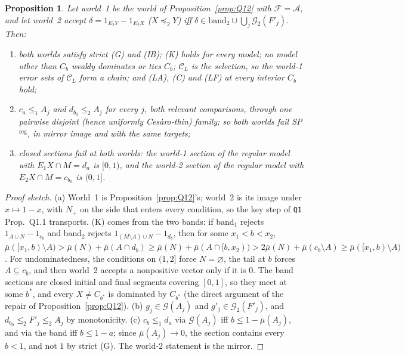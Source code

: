 \documentclass[11pt]{article}
\newtheorem{proposition}[theorem]{Proposition}
\theoremstyle{definition}
\theoremstyle{remark}
\newcommand{\C}{\mathcal C}
\newcommand{\src}[1]{\texttt{#1}}
\begin{document}
\begin{proposition}\label{prop:S31}
Let world~1 be the world of Proposition~\ref{prop:Q12} with $\mathcal F=\mathcal A$, and let world~2 accept $\delta=1_{E_2Y}-1_{E_2X}$ ($X\preceq_2Y$) iff $\delta\in\mathrm{band}_2\cup\bigcup_j\mathcal G_2(F'_j)$. Then:
\begin{enumerate}[leftmargin=*,label=(\alph*)]
\item both worlds satisfy strict (G) and (IB); (K) holds for every model; no model other than $C_b$ weakly dominates or ties $C_b$; $\C_L$ is the selection, so the world-1 error sets of $\C_L$ form a chain; and (LA), (C) and (LF) at every interior $C_b$ hold;
\item $c_a\le_1A_j$ and $d_{b_0}\le_2A_j$ for every $j$, both relevant comparisons, through one pairwise disjoint (hence uniformly Ces\`aro-thin) family; so both worlds fail SP$^{\mathrm{reg}}$, in mirror image and with the same targets;
\item closed sections fail at both worlds: the world-1 section of the regular model with $E_1X\cap M=d_a$ is $[0,1)$, and the world-2 section of the regular model with $E_2X\cap M=c_{b_0}$ is $(0,1]$.
\end{enumerate}
\end{proposition}
\begin{proof}[Proof sketch]
(a) World~1 is Proposition~\ref{prop:Q12}'s; world~2 is its image under $x\mapsto1-x$, with $N_+$ on the side that enters every condition, so the key step of \src{Q1} Prop.~Q1.1 transports. (K) comes from the two bands: if band$_1$ rejects $1_{A\cup N}-1_{c_b}$ and band$_2$ rejects $1_{(M\setminus A)\cup N}-1_{d_b}$, then for some $x_1<b<x_2$, $\bar\mu([x_1,b)\setminus A)>\bar\mu(N)+\bar\mu(A\cap d_b)\ge\bar\mu(N)+\bar\mu(A\cap[b,x_2))>2\bar\mu(N)+\bar\mu(c_b\setminus A)\ge\bar\mu([x_1,b)\setminus A)$. For undominatedness, the conditions on $(1,2]$ force $N=\varnothing$, the tail at $b$ forces $A\subseteq c_b$, and then world~2 accepts a nonpositive vector only if it is $0$. The band sections are closed initial and final segments covering $[0,1]$, so they meet at some $b^*$, and every $X\ne C_{b^*}$ is dominated by $C_{b^*}$ (the direct argument of the repair of Proposition~\ref{prop:Q12}). (b) $g_j\in\mathcal G(A_j)$ and $g'_j\in\mathcal G_2(F'_j)$, and $d_{b_0}\le_2F'_j\le_2A_j$ by monotonicity. (c) $c_b\le_1d_a$ via $\mathcal G(A_j)$ iff $b\le1-\bar\mu(A_j)$, and via the band iff $b\le1-a$; since $\bar\mu(A_j)\to0$, the section contains every $b<1$, and not $1$ by strict (G). The world-2 statement is the mirror.
\end{proof}
\end{document}
